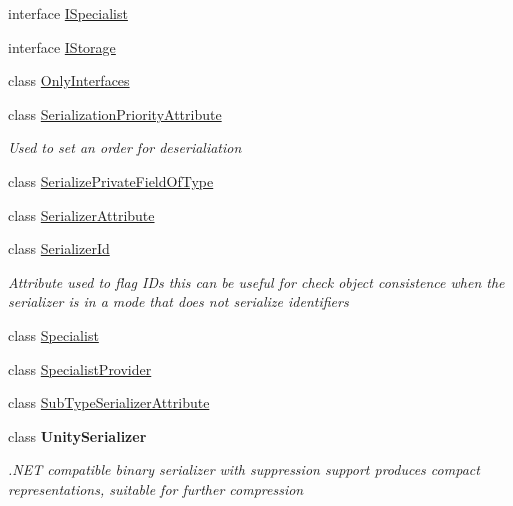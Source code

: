 \begin{DoxyCompactItemize}
\item 
interface \hyperlink{interface_serialization_1_1_i_specialist}{I\+Specialist}
\item 
interface \hyperlink{interface_serialization_1_1_i_storage}{I\+Storage}
\item 
class \hyperlink{class_serialization_1_1_only_interfaces}{Only\+Interfaces}
\item 
class \hyperlink{class_serialization_1_1_serialization_priority_attribute}{Serialization\+Priority\+Attribute}
\begin{DoxyCompactList}\small\item\em Used to set an order for deserialiation \end{DoxyCompactList}\item 
class \hyperlink{class_serialization_1_1_serialize_private_field_of_type}{Serialize\+Private\+Field\+Of\+Type}
\item 
class \hyperlink{class_serialization_1_1_serializer_attribute}{Serializer\+Attribute}
\item 
class \hyperlink{class_serialization_1_1_serializer_id}{Serializer\+Id}
\begin{DoxyCompactList}\small\item\em Attribute used to flag I\+Ds this can be useful for check object consistence when the serializer is in a mode that does not serialize identifiers \end{DoxyCompactList}\item 
class \hyperlink{class_serialization_1_1_specialist}{Specialist}
\item 
class \hyperlink{class_serialization_1_1_specialist_provider}{Specialist\+Provider}
\item 
class \hyperlink{class_serialization_1_1_sub_type_serializer_attribute}{Sub\+Type\+Serializer\+Attribute}
\item 
class {\bfseries Unity\+Serializer}
\begin{DoxyCompactList}\small\item\em .N\+ET compatible binary serializer with suppression support produces compact representations, suitable for further compression \end{DoxyCompactList}\end{DoxyCompactItemize}
